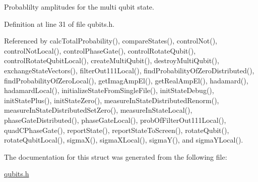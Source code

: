 Probablilty amplitudes for the multi qubit state. 



Definition at line 31 of file qubits.\+h.



Referenced by calc\+Total\+Probability(), compare\+States(), control\+Not(), control\+Not\+Local(), control\+Phase\+Gate(), control\+Rotate\+Qubit(), control\+Rotate\+Qubit\+Local(), create\+Multi\+Qubit(), destroy\+Multi\+Qubit(), exchange\+State\+Vectors(), filter\+Out111\+Local(), find\+Probability\+Of\+Zero\+Distributed(), find\+Probability\+Of\+Zero\+Local(), get\+Imag\+Amp\+El(), get\+Real\+Amp\+El(), hadamard(), hadamard\+Local(), initialize\+State\+From\+Single\+File(), init\+State\+Debug(), init\+State\+Plus(), init\+State\+Zero(), measure\+In\+State\+Distributed\+Renorm(), measure\+In\+State\+Distributed\+Set\+Zero(), measure\+In\+State\+Local(), phase\+Gate\+Distributed(), phase\+Gate\+Local(), prob\+Of\+Filter\+Out111\+Local(), quad\+C\+Phase\+Gate(), report\+State(), report\+State\+To\+Screen(), rotate\+Qubit(), rotate\+Qubit\+Local(), sigma\+X(), sigma\+X\+Local(), sigma\+Y(), and sigma\+Y\+Local().



The documentation for this struct was generated from the following file\+:\begin{DoxyCompactItemize}
\item 
\hyperlink{qubits_8h}{qubits.\+h}\end{DoxyCompactItemize}
